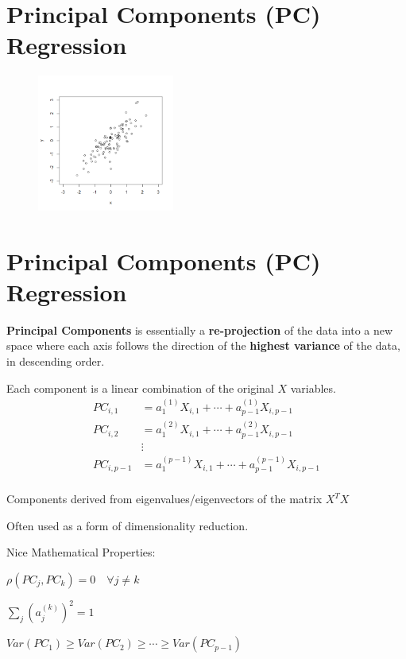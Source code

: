 \documentclass[12pt]{notes}
\begin{document}

\section{Principal Components (PC) Regression}
\begin{figure}[H]
\centering
\includegraphics[width=0.4\textwidth]{figures/module7/pc_scatter.png}
\end{figure}

\section{Principal Components (PC) Regression}
\textbf{Principal Components} is essentially a \textbf{re-projection} of the data into a new space where each axis follows the direction of the \textbf{highest variance} of the data, in descending order. 
\bi
\item Each component is a linear combination of the original $X$ variables. 
\begin{align*}
PC_{i, 1} &= a_1^{(1)}X_{i, 1} + \cdots + a^{(1)}_{p-1}X_{i, p-1} \\
PC_{i, 2} &= a_1^{(2)}X_{i, 1} + \cdots + a^{(2)}_{p-1}X_{i, p-1} \\
& \vdots \\
PC_{i, p-1} &= a_1^{(p-1)}X_{i, 1} + \cdots + a^{(p-1)}_{p-1}X_{i, p-1} \\
\end{align*}
\item Components derived from eigenvalues/eigenvectors of the matrix $X^TX$
\item Often used as a form of dimensionality reduction. 
\ei

Nice Mathematical Properties:
\bi
\item $\rho(PC_j, PC_k) = 0 \quad \forall j \ne k$
\item $\sum_j\left(a_j^{(k)}\right)^2 = 1$
\item $Var(PC_1) \ge Var(PC_2) \ge \cdots \ge Var(PC_{p-1})$
\ei
\end{document}

